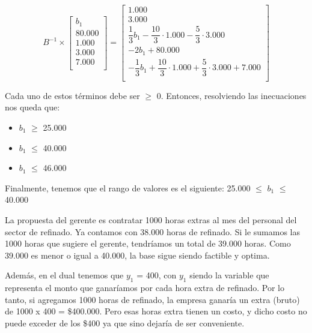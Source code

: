 \documentclass[10pt,a4paper]{article}
\begin{document}
\begin{enumerate}[label=\textbf{\sffamily\large\arabic*.}]
    \[
B^{-1} \times 
\begin{bmatrix}
    b_1 \\
    80{.}000 \\
    1{.}000  \\
    3{.}000  \\
    7{.}000  \\
\end{bmatrix}
=
\begin{bmatrix}
    1{.}000 \\
    3{.}000 \\
    \dfrac{1}{3} b_1 - \dfrac{10}{3} \cdot 1{.}000 - \dfrac{5}{3} \cdot 3{.}000 \\
    -2b_1 +80{.}000  \\
    -\dfrac{1}{3} b_1 + \dfrac{10}{3} \cdot 1{.}000 + \dfrac{5}{3} \cdot 3{.}000 + 7{.}000\\
\end{bmatrix}
\]

    

    \vspace{1em}
    Cada uno de estos términos debe ser $\geq$ 0. Entonces, resolviendo las inecuaciones nos queda que: 
    \begin{itemize}

        \item $b_1$ $\geq$ 25.000
        \item $b_1$ $\leq$ 40.000
        \item $b_1$ $\leq$ 46.000
        
    \end{itemize}
    
    Finalmente, tenemos que el rango de valores es el siguiente: 25.000 $\leq$ $b_1$ $\leq$ 40.000

    \vspace{1em}

La propuesta del gerente es contratar 1000 horas extras al mes del personal del sector de refinado. Ya contamos con 38.000 horas de refinado. Si le sumamos las 1000 horas que sugiere el gerente, tendríamos un total de 39.000 horas. Como 39.000 es menor o igual a 40.000, la base sigue siendo factible y optima.
    \vspace{1em}
    
Además, en el dual tenemos que $y_1$ = 400, con $y_1$ siendo la variable que representa el monto que ganaríamos por cada hora extra de refinado.
Por lo tanto, si agregamos 1000 horas de refinado, la empresa ganaría un extra (bruto) de 1000 x 400 = \$400.000.
Pero esas horas extra tienen un costo, y dicho costo no puede exceder de los \$400 ya que sino dejaría de ser conveniente.
    

\end{enumerate}
\end{document}
